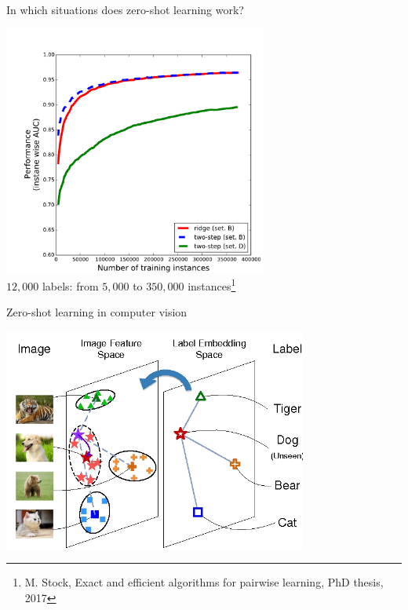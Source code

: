 \documentclass[]{beamer}
\begin{document}
\begin{frame}{In which situations does zero-shot learning work?} \pause 
 \center

\vspace{-0.5cm}
   \includegraphics[width=0.65\textwidth]{Figures/lc_wiki} \\
   $12,000$ labels: from $5,000$ to $350,000$ instances\footnote{M. Stock, Exact and efficient algorithms for pairwise learning, PhD thesis, 2017}
	\vspace{0.2cm}
\end{frame}


\begin{frame}{Zero-shot learning in computer vision}

\begin{center}
\includegraphics[width=0.75\textwidth]{Figures/zero-shot}
\end{center}

\end{frame}
\end{document}
